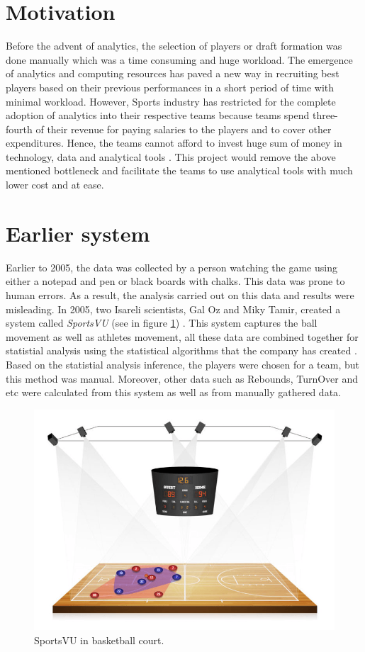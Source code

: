 \documentclass[format=sigconf]{acmart}
\begin{document}
\section{Motivation}
Before the advent of analytics, the selection of players or draft formation was done manually which was a time consuming and huge 
workload. The emergence of analytics and computing resources has paved a new way in recruiting best players based on their previous
performances in a short period of time with minimal workload. However, Sports industry has restricted for the complete adoption of 
analytics into their respective teams because teams spend three-fourth of their revenue for paying salaries to the players
and to cover other expenditures. Hence, the teams cannot afford to invest huge sum of money in technology, data and analytical 
tools  \cite{davenport2014analytics}. This project would remove the above mentioned bottleneck and facilitate the teams to use 
analytical tools with much lower cost and at ease. 

\section{Earlier system}
Earlier to 2005, the data was collected by a person watching the game using either a notepad and pen or black boards with chalks.
This data was prone to human errors. As a result, the analysis carried out on this data and results were misleading.
In 2005, two Isareli scientists, Gal Oz and Miky Tamir, created a system called \textit{SportsVU} (see in figure \ref{fig:SportsVU})
\cite{mccann2012player} \cite{warsaw}. This
system captures the ball movement as well as athletes movement, all these data are combined together for statistial analysis using 
the statistical algorithms that the company has created \cite{warriors}.
Based on the statistial analysis inference, the players were chosen for a team, but this method was manual. Moreover, other data such 
as Rebounds, TurnOver and etc were calculated from this system as well as from manually gathered data.

\begin{figure}[H]
    \centering
    \includegraphics[scale=0.20]{images/STATS-SportVU-technology.png}
    \caption{SportsVU in basketball court.}
    \label{fig:SportsVU}
\end{figure}
\end{document}
